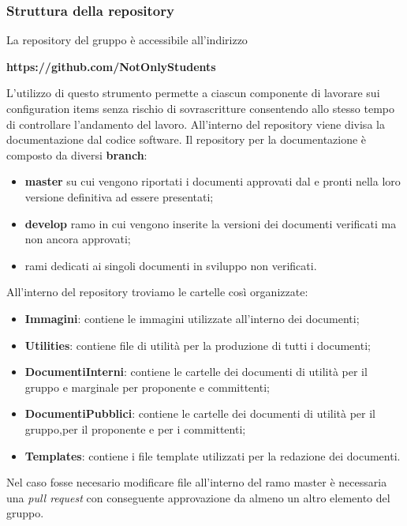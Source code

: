 \subsubsection{Struttura della repository}
La repository del gruppo \Gruppo è accessibile all'indirizzo
\begin{center}
	\textbf{https://github.com/NotOnlyStudents}
\end{center}
L'utilizzo di questo strumento permette a ciascun componente di lavorare sui configuration items senza rischio di sovrascritture consentendo allo stesso tempo di controllare l'andamento del lavoro. 
All'interno del repository viene divisa la documentazione dal codice software.
Il repository per la documentazione è composto da diversi \textbf{branch}:
\begin{itemize}
	\item \textbf{master} su cui vengono riportati i documenti approvati dal \Responsabile e pronti nella loro versione definitiva ad essere presentati;
	\item \textbf{develop} ramo in cui vengono inserite la versioni dei documenti verificati ma non ancora approvati;
	\item rami dedicati ai singoli documenti in sviluppo non verificati.
\end{itemize}
All'interno del repository troviamo le cartelle così organizzate:
\begin{itemize}
	\item \textbf{Immagini}: contiene le immagini utilizzate all'interno dei documenti;
	\item \textbf{Utilities}: contiene file di utilità per la produzione di tutti i documenti;
	\item \textbf{DocumentiInterni}: contiene le cartelle dei documenti di utilità per il gruppo e marginale per proponente e committenti;
	\item \textbf{DocumentiPubblici}: contiene le cartelle dei documenti di utilità per il gruppo,per il proponente e per i committenti;
	\item \textbf{Templates}: contiene i file template utilizzati per la redazione dei documenti.
\end{itemize}
Nel caso fosse necesario modificare file all'interno del ramo master è necessaria una \textit{pull request} con conseguente approvazione da almeno un altro elemento del gruppo.